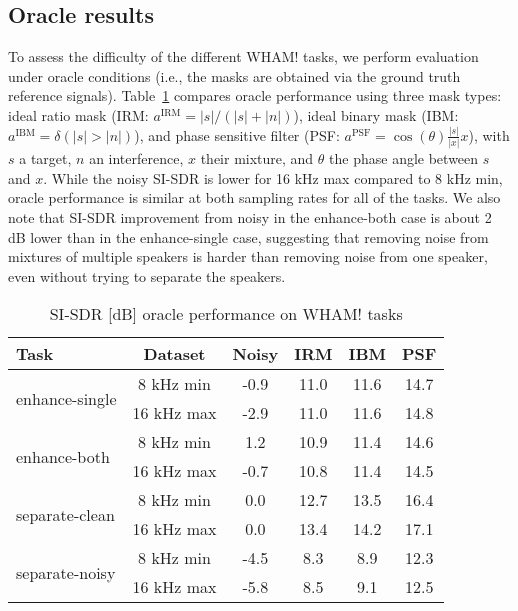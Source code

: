 \documentclass[a4paper]{article}
\begin{document}
\subsection{Oracle results}

To assess the difficulty of the different WHAM! tasks, we perform evaluation under oracle conditions (i.e., the masks are obtained via the ground truth reference signals).  Table~\ref{table:oracle} compares oracle performance using three mask types: ideal ratio mask (IRM: $a^{\mathrm{IRM}} = |s|\big/ (|s| + |n|) $), ideal binary mask (IBM: $a^{\mathrm{IBM}} = \delta(|s| > |n|)$), and phase sensitive filter (PSF: $a^{\mathrm{PSF}} = \cos(\theta) \frac{|s|}{|x|} x $), with $s$ a target, $n$ an interference, $x$ their mixture, and $\theta$ the phase angle between $s$ and $x$.  While the noisy SI-SDR is lower for 16 kHz max compared to 8 kHz min, oracle performance is similar at both sampling rates for all of the tasks.  We also note that SI-SDR improvement from noisy in the enhance-both case is about 2 dB lower than in the enhance-single case, suggesting that removing noise from mixtures of multiple speakers is harder than removing noise from one speaker, even without trying to separate the speakers.

\begin{table}[htbp]
    \footnotesize
    \caption{SI-SDR [dB] oracle performance on WHAM! tasks}\vspace{-0.6cm}
    \begin{center}
      \label{table:oracle}
      \begin{tabular}{lccccc}\hline
        Task & Dataset & Noisy & IRM & IBM & PSF \\ \hline \hline
        \multirow{2}{*}{enhance-single} & \phantom{1}8 kHz min & -0.9 & 11.0 & 11.6 & 14.7  \\
         & 16 kHz max & -2.9 & 11.0 & 11.6 & 14.8  \\ \hline
        \multirow{2}{*}{enhance-both} & \phantom{1}8 kHz min & \phantom{-}1.2 & 10.9 & 11.4 & 14.6 \\ 
         & 16 kHz max & -0.7 & 10.8 & 11.4 & 14.5  \\ \hline
        \multirow{2}{*}{separate-clean} & \phantom{1}8 kHz min & \phantom{-}0.0 & 12.7 & 13.5 & 16.4 \\ 
         & 16 kHz max & \phantom{-}0.0 & 13.4 & 14.2  & 17.1\\ \hline
        \multirow{2}{*}{separate-noisy} & \phantom{1}8 kHz min & -4.5 & \phantom{1}8.3 & \phantom{1}8.9  & 12.3 \\ 
         & 16 kHz max & -5.8 & \phantom{1}8.5 & \phantom{1}9.1  & 12.5 \\ \hline
      \end{tabular}\vspace{-.7cm}
    \end{center}
  \end{table}
\end{document}
